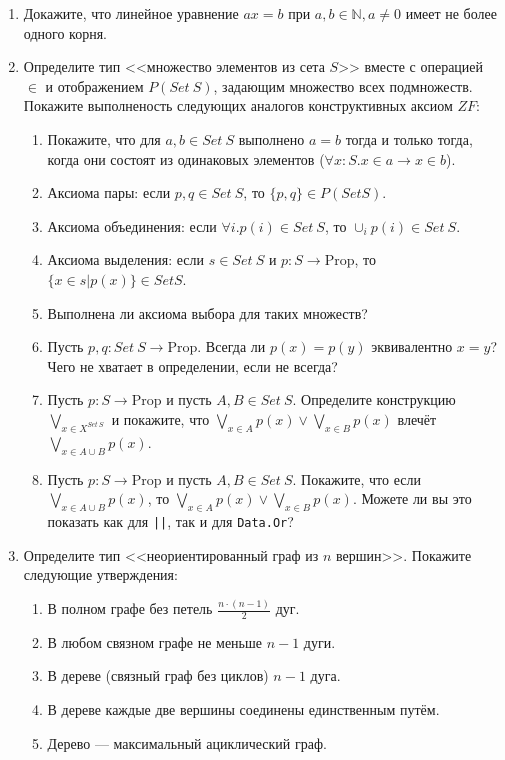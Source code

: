 \documentclass[10pt,a4paper,oneside]{article}
\begin{document}
\begin{enumerate}
\item Докажите, что линейное уравнение $ax = b$ при $a,b \in \mathbb{N}, a \ne 0$ имеет не более одного корня.

\item Определите тип <<множество элементов из сета $S$>> вместе с операцией $\in$ и отображением $P(Set\ S)$, задающим множество всех подмножеств. 
Покажите выполненость следующих аналогов конструктивных аксиом $ZF$:
\begin{enumerate}
\item Покажите, что для $a,b \in Set\ S$ выполнено $a = b$ тогда и только тогда, когда они состоят из одинаковых элементов ($\forall x:S.x \in a \rightarrow x \in b$).
\item Аксиома пары: если $p,q \in Set\ S$, то $\{p,q\} \in P(Set S)$.
\item Аксиома объединения: если $\forall i.p(i) \in Set\ S$, то $\cup_i p(i) \in Set\ S$.
\item Аксиома выделения: если $s \in Set\ S$ и $p : S \rightarrow \text{Prop}$, то $\{ x\in s | p(x)\} \in Set S$.
\item Выполнена ли аксиома выбора для таких множеств?
\item Пусть $p,q: Set\ S \rightarrow \text{Prop}$. Всегда ли $p(x) = p(y)$ эквивалентно $x=y$? Чего не хватает в определении, если не всегда?
\item Пусть $p: S \rightarrow \text{Prop}$ и пусть $A,B \in Set\ S$. Определите конструкцию $\bigvee_{x \in X^{Set\ S}}$ и 
покажите, что $\bigvee_{x \in A} p(x) \vee \bigvee_{x \in B} p(x)$ влечёт $\bigvee_{x\in A\cup B} p(x)$. 
\item Пусть $p: S \rightarrow \text{Prop}$ и пусть $A,B \in Set\ S$. Покажите, что если $\bigvee_{x\in A\cup B} p(x)$, то $\bigvee_{x \in A} p(x) \vee \bigvee_{x \in B} p(x)$.
Можете ли вы это показать как для \verb!||!, так и для \verb!Data.Or!?
\end{enumerate}

\item Определите тип <<неориентированный граф из $n$ вершин>>. Покажите следующие утверждения:
\begin{enumerate}
\item В полном графе без петель $\frac{n\cdot(n-1)}{2}$ дуг.
\item В любом связном графе не меньше $n-1$ дуги.
\item В дереве (связный граф без циклов) $n-1$ дуга.
\item В дереве каждые две вершины соединены единственным путём.
\item Дерево --- максимальный ациклический граф.
\end{enumerate}


\end{enumerate}
\end{document}
